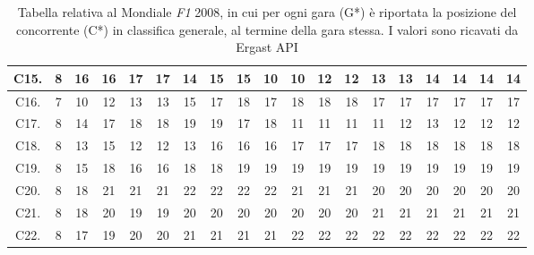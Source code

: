 \documentclass[12pt,a4paper,openright,twoside]{book}
\begin{document}
\begin{table}[H]
{\begin{tabular}{|c|c|c|c|c|c|c|c|c|c|c|c|c|c|c|c|c|c|c|}
    C15.  & 8 & 16 & 16 & 17 & 17 & 14 & 15 & 15 & 10 & 10 & 12 & 12 & 13 & 13 & 14 & 14 & 14 & 14 \\ \hline
    C16.  & 7 & 10 & 12 & 13 & 13 & 15 & 17 & 18 & 17 & 18 & 18 & 18 & 17 & 17 & 17 & 17 & 17 & 17 \\ \hline
    C17.  & 8 & 14 & 17 & 18 & 18 & 19 & 19 & 17 & 18 & 11 & 11 & 11 & 11 & 12 & 13 & 12 & 12 & 12 \\ \hline
    C18.    & 8 & 13 & 15 & 12 & 12 & 13 & 16 & 16 & 16 & 17 & 17 & 17 & 18 & 18 & 18 & 18 & 18 & 18 \\ \hline
    C19.  & 8 & 15 & 18 & 16 & 16 & 18 & 18 & 19 & 19 & 19 & 19 & 19 & 19 & 19 & 19 & 19 & 19 & 19 \\ \hline
    C20. & 8 & 18 & 21 & 21 & 21 & 22 & 22 & 22 & 22 & 21 & 21 & 21 & 20 & 20 & 20 & 20 & 20 & 20 \\ \hline
    C21. & 8 & 18 & 20 & 19 & 19 & 20 & 20 & 20 & 20 & 20 & 20 & 20 & 21 & 21 & 21 & 21 & 21 & 21 \\ \hline
    C22.  & 8 & 17 & 19 & 20 & 20 & 21 & 21 & 21 & 21 & 22 & 22 & 22 & 22 & 22 & 22 & 22 & 22 & 22 \\ \hline
    \end{tabular}}
    \endgroup
    
    \caption{Tabella relativa al Mondiale \textit{F1} 2008, in cui per ogni gara (G*)  è riportata la posizione del concorrente (C*) in classifica generale, al termine della gara stessa.
    I valori sono ricavati da Ergast API \cite{WebsiteErgastAPIStandings}}
    \label{table:classifichegeneralireali2008tabella}
\end{table}
\end{document}
